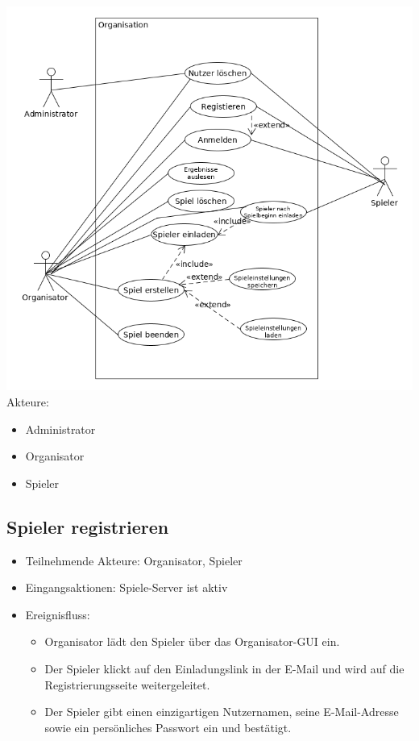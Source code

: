 \documentclass[a4paper]{scrreprt}
\begin{document}
    \includegraphics[width=\textwidth]{uml/export/Organisation.png}
    Akteure:
    \begin{itemize}
        \item \Gls{Administrator}
        \item \Gls{Organisator}
        \item \Gls{Spieler}
    \end{itemize}
    \newpage
   \subsection{Spieler registrieren}
    \begin{itemize}
        \item Teilnehmende Akteure: \Gls{Organisator}, \Gls{Spieler}
        \item Eingangsaktionen: Spiele-Server ist aktiv
        \item Ereignisfluss:
        \begin{itemize}
            \item Organisator lädt den Spieler über das Organisator-GUI ein.
            \item Der Spieler klickt auf den Einladungslink in der E-Mail und wird auf die Registrierungsseite weitergeleitet.
            \item Der Spieler gibt einen einzigartigen Nutzernamen, seine E-Mail-Adresse sowie ein persönliches Passwort ein und bestätigt.
        \end{itemize}
    \end{itemize}
\end{document}
